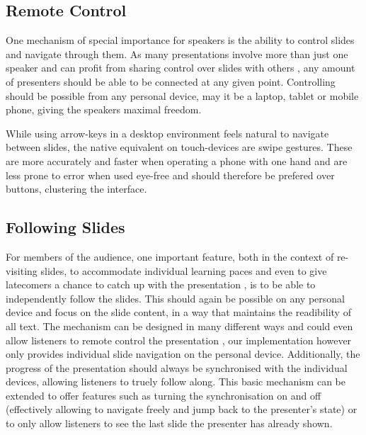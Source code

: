 %

\subsection{Remote Control}
One mechanism of special importance for speakers is the ability to control slides and navigate through them. As many presentations involve more than just one speaker and can profit from sharing control over slides with others \cite{Chattopadhyay:OfficeSocialRemoteControl}, any amount of presenters should be able to be connected at any given point. Controlling should be possible from any personal device, may it be a laptop, tablet or mobile phone, giving the speakers maximal freedom.

While using arrow-keys in a desktop environment feels natural to navigate between slides, the native equivalent on touch-devices are swipe gestures. These are more accurately and faster when operating a phone with one hand \cite{Lai:SingleHandedThumbInteraction} and are less prone to error when used eye-free \cite{Negulescu:TapSwipeMove} and should therefore be prefered over buttons, clustering the interface.

\subsection{Following Slides}
For members of the audience, one important feature, both in the context of re-visiting slides, to accommodate individual learning paces \cite{Cheng:TreebasedOnlinePresentations} and even to give latecomers a chance to catch up with the presentation \cite{Chattopadhyay:OfficeSocialRemoteControl}, is to be able to independently follow the slides. This should again be possible on any personal device and focus on the slide content, in a way that maintains the readibility of all text. The mechanism can be designed in many different ways and could even allow listeners to remote control the presentation \cite{Chattopadhyay:OfficeSocialRemoteControl}, our implementation however only provides individual slide navigation on the personal device. Additionally, the progress of the presentation should always be synchronised with the individual devices, allowing listeners to truely follow along. This basic mechanism can be extended to offer features such as turning the synchronisation on and off (effectively allowing to navigate freely and jump back to the presenter's state) or to only allow listeners to see the last slide the presenter has already shown.

